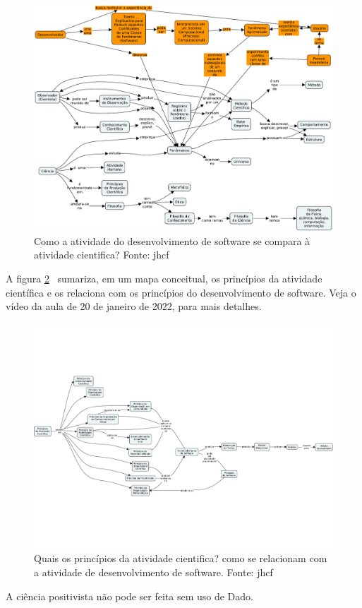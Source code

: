 \begin{figure}
    \centering
    \includegraphics[page=1,angle=90,width=1\textwidth]{1-Introducao/aulas/Desenvolvimento-de-Software-Ciencia-e-Filosofia.pdf}
    \caption{Como a atividade do desenvolvimento de software se compara à atividade cientifica? Fonte: jhcf}
    \label{fig:desenv-sw-ciencia-filosofia}
\end{figure}

A figura \ref{fig:principios:ativ:cientifica}~ sumariza, em um mapa conceitual, os princípios da atividade científica e os relaciona com os princípios do desenvolvimento de software.
Veja o vídeo da aula de 20 de janeiro de 2022, para mais detalhes.

\begin{figure}
    \centering
    \includegraphics[page=1,angle=90,width=1\textwidth]{1-Introducao/aulas/Principios-da-atividade-cientifica.pdf}
    \caption{Quais os princípios da  atividade cientifica? como se relacionam com a atividade de desenvolvimento de software. Fonte: jhcf}
    \label{fig:principios:ativ:cientifica}
\end{figure}

A ciência positivista não pode ser feita sem uso de \gls{Dado}.
